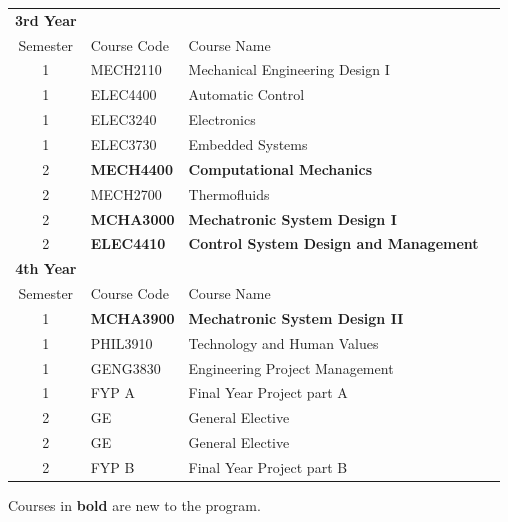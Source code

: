 \documentclass{UoNMCHA}
\numberwithin{equation}{section}
\begin{document}
\begin{table}[h!]
\begin{center}
{\begin{tabular}{c l l l|}
                \hline \textbf{3rd Year} &  \\
                Semester & {Course Code} & {Course Name} \\ \hline 
                1 & MECH2110 & Mechanical Engineering Design I\\
                1 & ELEC4400 & Automatic Control\\
                1 & ELEC3240 & Electronics\\
                1 & ELEC3730 & Embedded Systems \\ \hline
                2 & \textbf{MECH4400} & \textbf{Computational Mechanics}  \\
                2 & MECH2700 & Thermofluids \\
                2 & \textbf{MCHA3000} & \textbf{Mechatronic System Design I} \\
                2 & \textbf{ELEC4410} & \textbf{Control System Design and Management}   \\ \hline
                \hline \textbf{4th Year} &  \\
                Semester & {Course Code} & {Course Name} \\ \hline 
                1 & \textbf{MCHA3900} & \textbf{Mechatronic System Design II} \\
                1 & PHIL3910 & Technology and Human Values\\
                1 & GENG3830& Engineering Project Management\\
                1 & FYP A & Final Year Project part A\\ \hline
                2 & GE & General Elective\\
                2 & GE & General Elective\\
                2 & FYP B & Final Year Project part B \\ \hline
            \end{tabular}
        }
    \end{center}
\end{table}
Courses in \textbf{bold} are new to the program.
\end{document}
